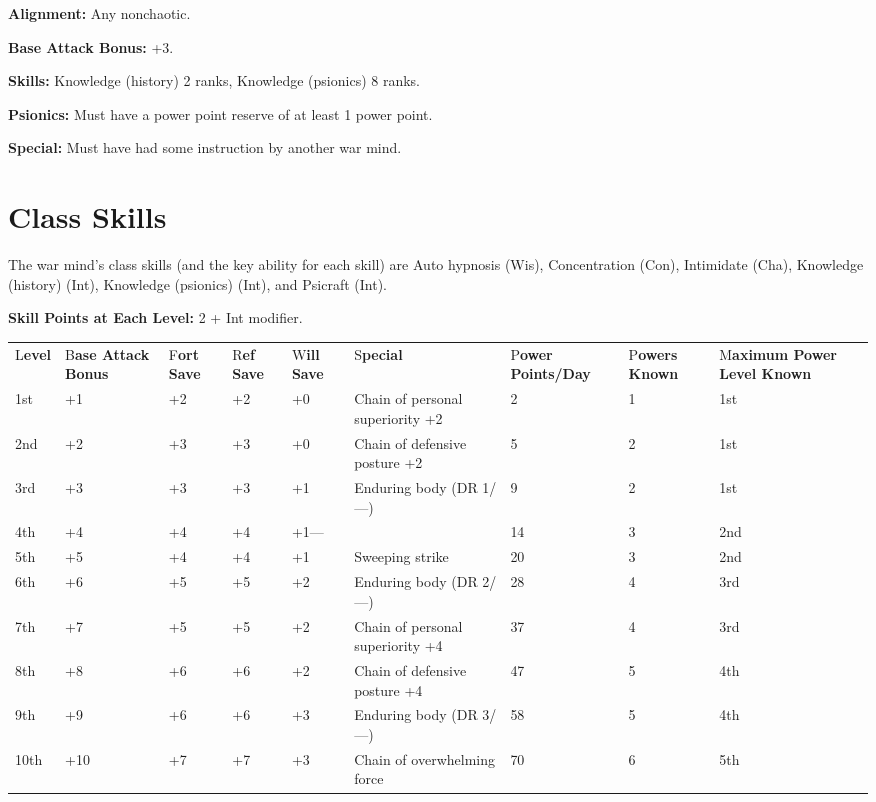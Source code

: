 \documentclass{article}
\begin{document}
\textbf{Alignment:} Any nonchaotic.

\textbf{Base Attack Bonus: }+3.

\textbf{Skills:} Knowledge (history) 2 ranks, Knowledge (psionics) 8 ranks.

\textbf{Psionics:} Must have a power point reserve of at least 1 power point.

\textbf{Special:} Must have had some instruction by another war mind.

\vspace{12pt}
\section*{\textbf{Class Skills}}

The war mind's class skills (and the key ability for each skill) are Auto hypnosis 
(Wis), Concentration (Con), Intimidate (Cha), Knowledge (history) (Int), Knowledge 
(psionics) (Int), and Psicraft (Int).

\textbf{Skill Points at Each Level:} 2 + Int modifier.

\vspace{12pt}
\begin{tabular}{|>{\raggedright}p{15pt}|>{\raggedright}p{18pt}|>{\raggedright}p{11pt}|>{\raggedright}p{14pt}|>{\raggedright}p{11pt}|>{\raggedright}p{80pt}|>{\raggedright}p{30pt}|>{\raggedright}p{21pt}|>{\raggedright}p{38pt}|}
\hline
\multicolumn{9}{|p{242pt}|}{T\textbf{able: The War Mind}}\tabularnewline
\hline
L\textbf{evel} & B\textbf{ase Attack Bonus} & F\textbf{ort Save} & R\textbf{ef 
Save} & W\textbf{ill Save} & S\textbf{pecial} & P\textbf{ower Points/Day} & P\textbf{owers 
Known} & M\textbf{aximum Power Level Known}\tabularnewline
\hline
1st & +1 & +2 & +2 & +0 & Chain of personal superiority +2 & 2 & 1 & 1st\tabularnewline
\hline
2nd & +2 & +3 & +3 & +0 & Chain of defensive posture +2 & 5 & 2 & 1st\tabularnewline
\hline
3rd & +3 & +3 & +3 & +1 & Enduring body (DR 1/---) & 9 & 2 & 1st\tabularnewline
\hline
4th & +4 & +4 & +4 & +1--- &  & 14 & 3 & 2nd\tabularnewline
\hline
5th & +5 & +4 & +4 & +1 & Sweeping strike & 20 & 3 & 2nd\tabularnewline
\hline
6th & +6 & +5 & +5 & +2 & Enduring body (DR 2/---) & 28 & 4 & 3rd\tabularnewline
\hline
7th & +7 & +5 & +5 & +2 & Chain of personal superiority +4 & 37 & 4 & 3rd\tabularnewline
\hline
8th & +8 & +6 & +6 & +2 & Chain of defensive posture +4 & 47 & 5 & 4th\tabularnewline
\hline
9th & +9 & +6 & +6 & +3 & Enduring body (DR 3/---) & 58 & 5 & 4th\tabularnewline
\hline
10th & +10 & +7 & +7 & +3 & Chain of overwhelming force & 70 & 6 & 5th\tabularnewline
\hline
\end{tabular}
\end{document}
